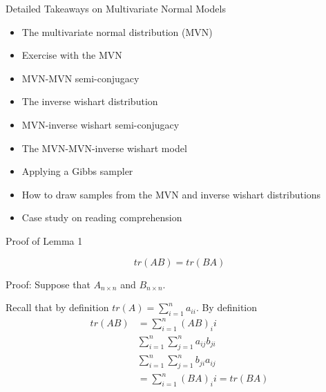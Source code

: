 \documentclass[
  ignorenonframetext,
]{beamer}
\providecommand{\tightlist}{%
  \setlength{\itemsep}{0pt}\setlength{\parskip}{0pt}}
\begin{document}
\begin{frame}{Detailed Takeaways on Multivariate Normal Models}
\protect\hypertarget{detailed-takeaways-on-multivariate-normal-models}{}

\begin{itemize}
\tightlist
\item
  The multivariate normal distribution (MVN)
\item
  Exercise with the MVN
\item
  MVN-MVN semi-conjugacy
\item
  The inverse wishart distribution
\item
  MVN-inverse wishart semi-conjugacy
\item
  The MVN-MVN-inverse wishart model
\item
  Applying a Gibbs sampler
\item
  How to draw samples from the MVN and inverse wishart distributions
\item
  Case study on reading comprehension
\end{itemize}

\end{frame}

\begin{frame}{Proof of Lemma 1}
\protect\hypertarget{proof-of-lemma-1}{}

\[tr(AB) = tr(BA)\]

Proof: Suppose that \(A_{n \times n}\) and \(B_{n \times n}.\)

Recall that by definition \(tr(A) = \sum_{i=1}^n a_{ii}.\) By definition
\begin{align}
tr(AB) &= \sum_{i=1}^n (AB)_ii \\
& \sum_{i=1}^n \sum_{j=1}^n a_{ij} b_{ji}\\
& \sum_{i=1}^n \sum_{j=1}^n b_{ji} a_{ij} \\
&= \sum_{i=1}^n (BA)_ii 
= tr(BA)
\end{align}

\end{frame}
\end{document}
